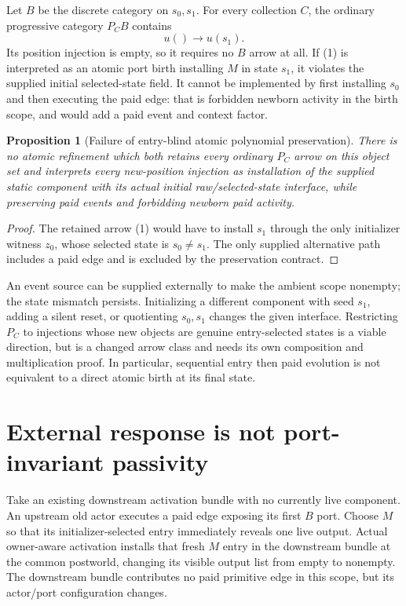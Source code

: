 \documentclass[11pt]{article}
\newtheorem{proposition}{Proposition}
\begin{document}
Let $B$ be the discrete category on $s_0,s_1$. For every collection $C$, the ordinary progressive category $P_CB$ contains
\[
                         u()\longrightarrow u(s_1).       \tag{1}
\]
Its position injection is empty, so it requires no $B$ arrow at all. If (1) is interpreted as an atomic port birth installing $M$ in state $s_1$, it violates the supplied initial selected-state field. It cannot be implemented by first installing $s_0$ and then executing the paid edge: that is forbidden newborn activity in the birth scope, and would add a paid event and context factor.

\begin{proposition}[Failure of entry-blind atomic polynomial preservation]
There is no atomic refinement which both retains every ordinary $P_C$ arrow on this object set and interprets every new-position injection as installation of the supplied static component with its actual initial raw/selected-state interface, while preserving paid events and forbidding newborn paid activity.
\end{proposition}
\begin{proof}
The retained arrow (1) would have to install $s_1$ through the only initializer witness $z_0$, whose selected state is $s_0\ne s_1$. The only supplied alternative path includes a paid edge and is excluded by the preservation contract.\end{proof}

An event source can be supplied externally to make the ambient scope nonempty; the state mismatch persists. Initializing a different component with seed $s_1$, adding a silent reset, or quotienting $s_0,s_1$ changes the given interface. Restricting $P_C$ to injections whose new objects are genuine entry-selected states is a viable direction, but is a changed arrow class and needs its own composition and multiplication proof. In particular, sequential entry then paid evolution is not equivalent to a direct atomic birth at its final state.

\section{External response is not port-invariant passivity}
Take an existing downstream activation bundle with no currently live component. An upstream old actor executes a paid edge exposing its first $B$ port. Choose $M$ so that its initializer-selected entry immediately reveals one live output. Actual owner-aware activation installs that fresh $M$ entry in the downstream bundle at the common postworld, changing its visible output list from empty to nonempty. The downstream bundle contributes no paid primitive edge in this scope, but its actor/port configuration changes.
\end{document}
